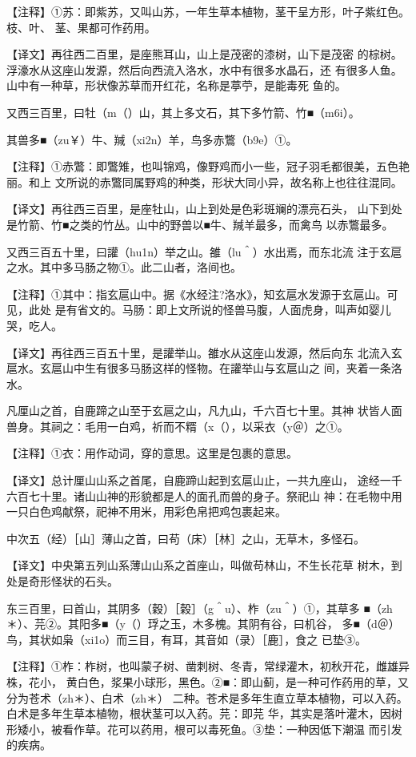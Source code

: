 \documentclass[a4paper,12pt,UTF8,twoside]{ctexbook}
\begin{document}
【注释】①苏：即紫苏，又叫山苏，一年生草本植物，茎干呈方形，叶子紫红色。枝、叶、 茎、果都可作药用。

【译文】再往西二百里，是座熊耳山，山上是茂密的漆树，山下是茂密 的棕树。浮濠水从这座山发源，然后向西流入洛水，水中有很多水晶石，还 有很多人鱼。山中有一种草，形状像苏草而开红花，名称是葶苧，是能毒死 鱼的。

又西三百里，曰牡（m（）山，其上多文石，其下多竹箭、竹■（m6i）。

其兽多■（zu￥）牛、羬（xi2n）羊，鸟多赤鷩（b9e）①。

【注释】①赤鷩：即鷩雉，也叫锦鸡，像野鸡而小一些，冠子羽毛都很美，五色艳丽。和上 文所说的赤鷩同属野鸡的种类，形状大同小异，故名称上也往往混同。

【译文】再往西三百里，是座牡山，山上到处是色彩斑斓的漂亮石头， 山下到处是竹箭、竹■之类的竹丛。山中的野兽以■牛、羬羊最多，而禽鸟 以赤鷩最多。

又西三百五十里，曰讙（hu1n）举之山。雒（lu＾）水出焉，而东北流 注于玄扈之水。其中多马肠之物①。此二山者，洛间也。

【注释】①其中：指玄扈山中。据《水经注?洛水》，知玄扈水发源于玄扈山。可见，此处 是有省文的。马肠：即上文所说的怪兽马腹，人面虎身，叫声如婴儿哭，吃人。

【译文】再往西三百五十里，是讙举山。雒水从这座山发源，然后向东 北流入玄扈水。玄扈山中生有很多马肠这样的怪物。在讙举山与玄扈山之 间，夹着一条洛水。

凡厘山之首，自鹿蹄之山至于玄扈之山，凡九山，千六百七十里。其神 状皆人面兽身。其祠之：毛用一白鸡，祈而不糈（x（），以采衣（y＠）之①。

【注释】①衣：用作动词，穿的意思。这里是包裹的意思。

【译文】总计厘山山系之首尾，自鹿蹄山起到玄扈山止，一共九座山， 途经一千六百七十里。诸山山神的形貌都是人的面孔而兽的身子。祭祀山 神：在毛物中用一只白色鸡献祭，祀神不用米，用彩色帛把鸡包裹起来。

中次五（经）［山］薄山之首，曰苟（床）［林］之山，无草木，多怪石。

【译文】中央第五列山系薄山山系之首座山，叫做苟林山，不生长花草 树木，到处是奇形怪状的石头。

东三百里，曰首山，其阴多（穀）［榖］（g＾u）、柞（zu＾）①，其草多 ■（zh＊）、芫②。其阳多■（y（）琈之玉，木多槐。其阴有谷，曰机谷， 多■（d＠）鸟，其状如枭（xi1o）而三目，有耳，其音如（录）［鹿］，食之 已垫③。

【注释】①柞：柞树，也叫蒙子树、凿刺树、冬青，常绿灌木，初秋开花，雌雄异株，花小， 黄白色，浆果小球形，黑色。②■：即山蓟，是一种可作药用的草，又分为苍术（zh＊）、白术（zh＊） 二种。苍术是多年生直立草本植物，可以入药。白术是多年生草本植物，根状茎可以入药。芫：即芫 华，其实是落叶灌木，因树形矮小，被看作草。花可以药用，根可以毒死鱼。③垫：一种因低下潮温 而引发的疾病。
\end{document}

